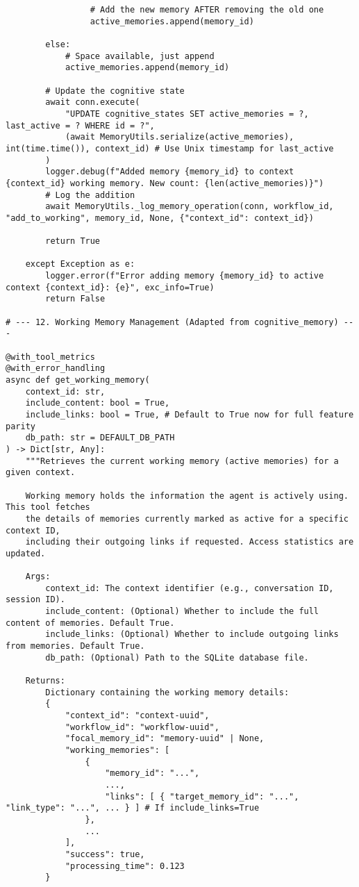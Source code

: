 \documentclass[12pt,a4paper]{article}
\begin{document}
\begin{pageablecode}
\begin{verbatim}
                 # Add the new memory AFTER removing the old one
                 active_memories.append(memory_id)

        else:
            # Space available, just append
            active_memories.append(memory_id)

        # Update the cognitive state
        await conn.execute(
            "UPDATE cognitive_states SET active_memories = ?, last_active = ? WHERE id = ?",
            (await MemoryUtils.serialize(active_memories), int(time.time()), context_id) # Use Unix timestamp for last_active
        )
        logger.debug(f"Added memory {memory_id} to context {context_id} working memory. New count: {len(active_memories)}")
        # Log the addition
        await MemoryUtils._log_memory_operation(conn, workflow_id, "add_to_working", memory_id, None, {"context_id": context_id})

        return True

    except Exception as e:
        logger.error(f"Error adding memory {memory_id} to active context {context_id}: {e}", exc_info=True)
        return False

# --- 12. Working Memory Management (Adapted from cognitive_memory) ---

@with_tool_metrics
@with_error_handling
async def get_working_memory(
    context_id: str,
    include_content: bool = True,
    include_links: bool = True, # Default to True now for full feature parity
    db_path: str = DEFAULT_DB_PATH
) -> Dict[str, Any]:
    """Retrieves the current working memory (active memories) for a given context.

    Working memory holds the information the agent is actively using. This tool fetches
    the details of memories currently marked as active for a specific context ID,
    including their outgoing links if requested. Access statistics are updated.

    Args:
        context_id: The context identifier (e.g., conversation ID, session ID).
        include_content: (Optional) Whether to include the full content of memories. Default True.
        include_links: (Optional) Whether to include outgoing links from memories. Default True.
        db_path: (Optional) Path to the SQLite database file.

    Returns:
        Dictionary containing the working memory details:
        {
            "context_id": "context-uuid",
            "workflow_id": "workflow-uuid",
            "focal_memory_id": "memory-uuid" | None,
            "working_memories": [
                {
                    "memory_id": "...",
                    ...,
                    "links": [ { "target_memory_id": "...", "link_type": "...", ... } ] # If include_links=True
                },
                ...
            ],
            "success": true,
            "processing_time": 0.123
        }


\end{verbatim}
\end{pageablecode}
\end{document}
